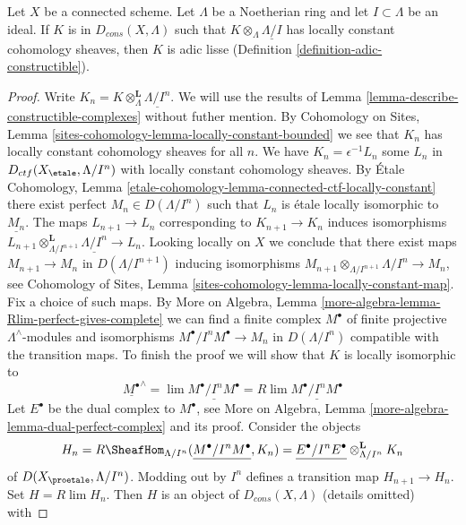 \begin{lemma}
\label{lemma-connected-adic-lisse}
Let $X$ be a connected scheme. Let $\Lambda$ be a Noetherian ring and let
$I \subset \Lambda$ be an ideal. If $K$ is in $D_{cons}(X, \Lambda)$
such that $K \otimes_\Lambda \underline{\Lambda/I}$
has locally constant cohomology sheaves, then $K$ is adic lisse
(Definition \ref{definition-adic-constructible}).
\end{lemma}

\begin{proof}
Write $K_n = K \otimes_\Lambda^\mathbf{L} \underline{\Lambda/I^n}$.
We will use the results of Lemma \ref{lemma-describe-constructible-complexes}
without futher mention. By Cohomology on Sites, Lemma
\ref{sites-cohomology-lemma-locally-constant-bounded}
we see that $K_n$ has locally constant cohomology sheaves for all $n$.
We have $K_n = \epsilon^{-1}L_n$ some $L_n$ in
$D_{ctf}(X_\etale, \Lambda/I^n)$ with locally constant cohomology sheaves.
By \'Etale Cohomology, Lemma
\ref{etale-cohomology-lemma-connected-ctf-locally-constant}
there exist perfect $M_n \in D(\Lambda/I^n)$
such that $L_n$ is \'etale locally isomorphic to $\underline{M_n}$.
The maps $L_{n + 1} \to L_n$ corresponding to $K_{n + 1} \to K_n$
induces isomorphisms
$L_{n + 1} \otimes_{\Lambda/I^{n + 1}}^\mathbf{L} \underline{\Lambda/I^n}
\to L_n$. Looking locally on $X$ we conclude that there
exist maps $M_{n + 1} \to M_n$ in $D(\Lambda/I^{n + 1})$
inducing isomorphisms
$M_{n + 1} \otimes_{\Lambda/I^{n + 1}} \Lambda/I^n \to M_n$, see
Cohomology of Sites, Lemma \ref{sites-cohomology-lemma-locally-constant-map}.
Fix a choice of such maps. By
More on Algebra, Lemma \ref{more-algebra-lemma-Rlim-perfect-gives-complete}
we can find a finite complex $M^\bullet$ of finite projective
$\Lambda^\wedge$-modules and isomorphisms $M^\bullet/I^nM^\bullet \to M_n$
in $D(\Lambda/I^n)$ compatible with the transition maps.
To finish the proof we will show that $K$ is locally isomorphic
to
$$
\underline{M^\bullet}^\wedge =
\lim \underline{M^\bullet/I^nM^\bullet} =
R\lim \underline{M^\bullet/I^nM^\bullet}
$$
Let $E^\bullet$ be the dual complex to $M^\bullet$, see
More on Algebra, Lemma \ref{more-algebra-lemma-dual-perfect-complex}
and its proof. Consider the objects
$$
H_n =
R\SheafHom_{\Lambda/I^n}(\underline{M^\bullet/I^nM^\bullet}, K_n) =
\underline{E^\bullet/I^nE^\bullet} \otimes_{\Lambda/I^n}^\mathbf{L} K_n
$$
of $D(X_\proetale, \Lambda/I^n)$. Modding out by $I^n$ defines a
transition map $H_{n + 1} \to H_n$. Set $H = R\lim H_n$. Then $H$ is an
object of $D_{cons}(X, \Lambda)$ (details omitted) with

\end{proof}
